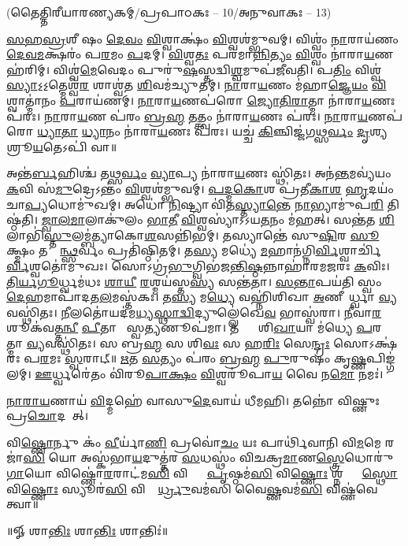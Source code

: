 

\vspace{-1ex}
\centerline{\normalsize(𑌤𑍈𑌤𑍍𑌤𑌿𑌰𑍀𑌯𑌾𑌰𑌣𑍍𑌯𑌕𑌮𑍍/𑌪𑍍𑌰𑌪𑌾𑌠𑌕𑌃 – 10/𑌅𑌨𑍁𑌵𑌾𑌕𑌃 – 13)}

\ul{𑌸}\ul{𑌹}\ul{𑌸𑍍𑌰}𑌶𑍀\sr%
𑌷𑌂 \ul{𑌦𑍇}\ul{𑌵𑌂} \ul{𑌵𑌿}𑌶𑍍𑌵𑌾𑌕𑍍𑌷𑌂॑ \ul{𑌵𑌿}𑌶𑍍𑌵𑌶॑𑌮𑍍𑌭𑍁𑌵𑌮𑍍। 𑌵𑌿𑌶𑍍𑌵𑌂॑ \ul{𑌨𑌾}𑌰𑌾𑌯॑𑌣𑌂 \ul{𑌦𑍇}\ul{𑌵}\ul{𑌮}𑌕𑍍𑌷𑌰𑌂॑ 𑌪\ul{𑌰}𑌮𑌂 \ul{𑌪}𑌦𑌮𑍍। 
\ul{𑌵𑌿}𑌶𑍍𑌵\ul{𑌤𑌃} 𑌪𑌰॑𑌮𑌾\ul{𑌨𑍍𑌨𑌿}\ul{𑌤𑍍𑌯𑌂} \ul{𑌵𑌿}𑌶𑍍𑌵𑌂 𑌨𑌾॑𑌰𑌾\ul{𑌯}𑌣 𑌹॑𑌰𑌿𑌮𑍍। 𑌵𑌿𑌶𑍍𑌵॑\ul{𑌮𑍇}𑌵𑍇𑌦𑌂 𑌪𑍁𑌰𑍁॑\ul{𑌷}𑌸𑍍𑌤𑌦𑍍𑌵𑌿\ul{𑌶𑍍𑌵}𑌮𑍁𑌪॑𑌜𑍀𑌵𑌤𑌿। 
𑌪\ul{𑌤𑌿𑌂}   𑌵𑌿𑌶𑍍𑌵॑\ul{𑌸𑍍𑌯𑌾}𑌽॒𑌽॒𑌤𑍍𑌮𑍇𑌶𑍍𑌵॑\ul{𑌰}\ul{} 𑌶𑌾𑌶𑍍𑌵॑𑌤 \ul{𑌶𑌿}𑌵𑌮॑𑌚𑍍𑌯𑍁𑌤𑌮𑍍। \ul{𑌨𑌾}𑌰𑌾\ul{𑌯}𑌣𑌂 𑌮॑𑌹𑌾\ul{𑌜𑍍𑌞𑍇}\ul{𑌯𑌂} \ul{𑌵𑌿}𑌶𑍍𑌵𑌾𑌤𑍍𑌮𑌾॑𑌨𑌂 \ul{𑌪}𑌰𑌾𑌯॑𑌣𑌮𑍍। \ul{𑌨𑌾}𑌰𑌾\ul{𑌯}𑌣𑌪॑𑌰𑍋 \ul{𑌜𑍍𑌯𑍋}\ul{𑌤𑌿}\ul{𑌰𑌾}𑌤𑍍𑌮𑌾 𑌨𑌾॑𑌰𑌾\ul{𑌯}𑌣𑌃 𑌪॑𑌰𑌃। \ul{𑌨𑌾}𑌰𑌾\ul{𑌯}𑌣 𑌪॑𑌰𑌂 \ul{𑌬𑍍𑌰}\ul{𑌹𑍍𑌮} \ul{𑌤}𑌤𑍍𑌤𑍍𑌵𑌂 𑌨𑌾॑𑌰𑌾\ul{𑌯}𑌣𑌃 𑌪॑𑌰𑌃। \ul{𑌨𑌾}𑌰𑌾\ul{𑌯}𑌣𑌪॑𑌰𑍋 \ul{𑌧𑍍𑌯𑌾}\ul{𑌤𑌾} \ul{𑌧𑍍𑌯𑌾}𑌨𑌂 𑌨𑌾॑𑌰𑌾\ul{𑌯}𑌣𑌃 𑌪॑𑌰𑌃। 𑌯𑌚𑍍𑌚॑ \ul{𑌕𑌿}𑌞𑍍𑌚𑌿𑌜𑍍𑌜॑𑌗\ul{𑌥𑍍𑌸}\ul{𑌰𑍍𑌵𑌂} \ul{𑌦𑍃}𑌶𑍍𑌯𑌤𑍇᳚ 𑌶𑍍𑌰𑍂\ul{𑌯}𑌤𑍇𑌽𑌪𑌿॑ 𑌵𑌾॥ 

𑌅𑌨𑍍𑌤॑\ul{𑌰𑍍𑌬}𑌹𑌿𑌶𑍍𑌚॑ 𑌤\ul{𑌥𑍍𑌸}\ul{𑌰𑍍𑌵𑌂} \ul{𑌵𑍍𑌯𑌾}𑌪𑍍𑌯 𑌨𑌾॑𑌰𑌾\ul{𑌯}𑌣𑌃 𑌸𑍍𑌥𑌿॑𑌤𑌃। 𑌅𑌨॑\ul{𑌨𑍍𑌤}𑌮𑌵𑍍𑌯॑𑌯𑌂 \ul{𑌕}𑌵𑌿 𑌸॑\ul{𑌮𑍁}𑌦𑍍𑌰𑍇𑌽𑌨𑍍𑌤𑌂॑  \ul{𑌵𑌿}𑌶𑍍𑌵𑌶॑𑌮𑍍𑌭𑍁𑌵𑌮𑍍। \ul{𑌪}\ul{𑌦𑍍𑌮}\ul{𑌕𑍋}𑌶 𑌪𑍍𑌰॑𑌤𑍀\ul{𑌕𑌾}\ul{𑌶}\ul{} \ul{𑌹𑍃}𑌦𑌯𑌂॑ 𑌚𑌾\ul{𑌪𑍍𑌯}𑌧𑍋𑌮𑍁॑𑌖𑌮𑍍। 𑌅𑌧𑍋॑ \ul{𑌨𑌿}𑌷𑍍𑌟𑍍𑌯𑌾 𑌵𑌿॑𑌤\ul{𑌸𑍍𑌤𑍍𑌯𑌾}\ul{𑌨𑍍𑌤𑍇} \ul{𑌨𑌾}𑌭𑍍𑌯𑌾𑌮𑍁॑𑌪\ul{𑌰𑌿} 𑌤𑌿𑌷𑍍𑌠॑𑌤𑌿। \ul{𑌜𑍍𑌵𑌾}\ul{𑌲}\ul{𑌮𑌾}𑌲𑌾𑌕𑍁॑𑌲𑌂 \ul{𑌭𑌾}\ul{𑌤𑍀} \ul{𑌵𑌿}𑌶𑍍𑌵𑌸𑍍𑌯𑌾॑𑌽𑌽𑌯\ul{𑌤}𑌨𑌂 𑌮॑𑌹𑌤𑍍। 𑌸𑌨𑍍𑌤॑𑌤 \ul{𑌶𑌿}𑌲𑌾𑌭𑌿॑\ul{𑌸𑍍𑌤𑍁}\-𑌲𑌮𑍍𑌬॑𑌤𑍍𑌯𑌾𑌕𑍋\ul{𑌶}𑌸𑌨𑍍𑌨𑌿॑𑌭𑌮𑍍। 𑌤𑌸𑍍𑌯𑌾𑌨𑍍𑌤𑍇॑ 𑌸𑍁\ul{𑌷𑌿}𑌰 \ul{𑌸𑍂}𑌕𑍍𑌷𑍍𑌮𑌂 𑌤𑌸𑍍𑌮𑌿᳚\ul{𑌨𑍍𑌥𑍍𑌸}𑌰𑍍𑌵𑌂 𑌪𑍍𑌰𑌤𑌿॑𑌷𑍍𑌠𑌿𑌤𑌮𑍍। 𑌤\ul{𑌸𑍍𑌯} 𑌮𑌧𑍍𑌯𑍇॑ \ul{𑌮}𑌹𑌾𑌨॑\-𑌗𑍍𑌨𑌿\ul{𑌰𑍍𑌵𑌿}𑌶𑍍𑌵𑌾𑌰𑍍𑌚𑌿॑\ul{𑌰𑍍𑌵𑌿}𑌶𑍍𑌵𑌤𑍋॑𑌮𑍁𑌖𑌃। 𑌸𑍋𑌽𑌗𑍍𑌰॑\ul{𑌭𑍁}𑌗𑍍𑌵𑌿𑌭॑𑌜\ul{𑌨𑍍𑌤𑌿}\ul{𑌷𑍍𑌠}𑌨𑍍𑌨𑌾𑌹𑌾॑𑌰𑌮\ul{𑌜}𑌰𑌃 \ul{𑌕}𑌵𑌿𑌃। \ul{𑌤𑌿}\ul{𑌰𑍍𑌯}\ul{𑌗𑍂}𑌰𑍍𑌧𑍍𑌵𑌮॑𑌧𑌃 \ul{𑌶𑌾}\ul{𑌯𑍀} \ul{𑌰}𑌶𑍍𑌮𑌯॑𑌸𑍍𑌤\ul{𑌸𑍍𑌯} 𑌸𑌨𑍍𑌤॑𑌤𑌾। \ul{𑌸}\ul{𑌨𑍍𑌤𑌾}𑌪𑌯॑𑌤𑌿 𑌸𑍍𑌵𑌂 \ul{𑌦𑍇}𑌹𑌮𑌾𑌪𑌾॑𑌦𑌤\ul{𑌲}𑌮𑌸𑍍𑌤॑𑌕𑌃। 𑌤\ul{𑌸𑍍𑌯} 𑌮\ul{𑌧𑍍𑌯𑍇} 𑌵𑌹𑍍𑌨𑌿॑𑌶𑌿𑌖𑌾 \ul{𑌅}𑌣𑍀𑌯𑍋᳚𑌰𑍍𑌧𑍍𑌵𑌾 \ul{𑌵𑍍𑌯}𑌵𑌸𑍍𑌥𑌿॑𑌤𑌃। \ul{𑌨𑍀}𑌲𑌤𑍋॑𑌯𑌦॑\-𑌮\ul{𑌧𑍍𑌯}\ul{𑌸𑍍𑌥𑌾}\ul{𑌦𑍍𑌵𑌿}𑌦𑍍𑌯𑍁𑌲𑍍𑌲𑍇॑𑌖𑍇\ul{𑌵}  𑌭𑌾𑌸𑍍𑌵॑𑌰𑌾। \ul{𑌨𑍀}𑌵𑌾\ul{𑌰}𑌶𑍂𑌕॑𑌵\ul{𑌤𑍍𑌤}\ul{𑌨𑍍𑌵𑍀} \ul{𑌪𑍀}𑌤𑌾 𑌭𑌾᳚𑌸𑍍𑌵\ul{𑌤𑍍𑌯}𑌣𑍂𑌪॑𑌮𑌾। 𑌤𑌸𑍍𑌯𑌾𑌃᳚ 𑌶𑌿\ul{𑌖𑌾}𑌯𑌾 𑌮॑𑌧𑍍𑌯𑍇 \ul{𑌪}𑌰𑌮𑌾᳚𑌤𑍍𑌮𑌾 \ul{𑌵𑍍𑌯}𑌵𑌸𑍍𑌥𑌿॑𑌤𑌃। 𑌸 𑌬𑍍𑌰\ul{𑌹𑍍𑌮} 𑌸 𑌶𑌿\ul{𑌵𑌃} 𑌸 𑌹\ul{𑌰𑌿𑌃} 𑌸𑍇\ul{𑌨𑍍𑌦𑍍𑌰𑌃} 𑌸𑍋𑌽𑌕𑍍𑌷॑𑌰𑌃 𑌪\ul{𑌰}𑌮𑌃 \ul{𑌸𑍍𑌵}𑌰𑌾𑌟𑍍॥ 
\ul{𑌋}𑌤 \ul{𑌸}𑌤𑍍𑌯𑌂 𑌪॑𑌰𑌂 \ul{𑌬𑍍𑌰}\ul{𑌹𑍍𑌮} \ul{𑌪𑍁}𑌰𑍁𑌷𑌂॑ 𑌕𑍃\ul{𑌷𑍍𑌣}𑌪𑌿𑌙𑍍𑌗॑𑌲𑌮𑍍। \ul{𑌊}𑌰𑍍𑌧𑍍𑌵𑌰𑍇॑𑌤𑌂 𑌵𑌿॑𑌰𑍂\ul{𑌪𑌾}\ul{𑌕𑍍𑌷𑌂} \ul{𑌵𑌿}𑌶𑍍𑌵𑌰𑍂॑𑌪𑌾\ul{𑌯} 𑌵𑍈 𑌨\ul{𑌮𑍋} 𑌨𑌮𑌃॑। 

\ul{𑌨𑌾}\ul{𑌰𑌾}\ul{𑌯}𑌣𑌾𑌯॑ \ul{𑌵𑌿}𑌦𑍍𑌮𑌹𑍇॑ 𑌵𑌾𑌸𑍁\ul{𑌦𑍇}𑌵𑌾𑌯॑ 𑌧𑍀𑌮𑌹𑌿। 𑌤𑌨𑍍𑌨𑍋॑ 𑌵𑌿𑌷𑍍𑌣𑍁𑌃 𑌪𑍍𑌰\ul{𑌚𑍋}𑌦𑌯𑌾᳚𑌤𑍍। 

𑌵𑌿\ul{𑌷𑍍𑌣𑍋}𑌰𑍍𑌨𑍁 𑌕𑌂॑ \ul{𑌵𑍀}𑌰𑍍𑌯𑌾॑\ul{𑌣𑌿} 𑌪𑍍𑌰𑌵𑍋॑\ul{𑌚𑌂} 𑌯𑌃 𑌪𑌾𑌰𑍍𑌥𑌿॑𑌵𑌾𑌨𑌿 𑌵𑌿\ul{𑌮}𑌮𑍇 𑌰𑌜𑌾॑\ul{𑌸𑌿} 𑌯𑍋 𑌅𑌸𑍍𑌕॑𑌭𑌾\ul{𑌯}𑌦𑍁𑌤𑍍𑌤॑𑌰 \ul{𑌸}𑌧𑌸𑍍𑌥𑌂॑ 𑌵𑌿𑌚𑌕𑍍𑌰\ul{𑌮𑌾}𑌣\ul{𑌸𑍍𑌤𑍍𑌰𑍇}𑌧𑍋𑌰𑍁॑\ul{𑌗𑌾}𑌯𑍋 𑌵𑌿𑌷𑍍𑌣𑍋॑\ul{𑌰}𑌰𑌾𑌟॑𑌮\ul{𑌸𑌿} 𑌵𑌿𑌷𑍍𑌣𑍋𑌃᳚ \ul{𑌪𑍃}𑌷𑍍𑌠𑌮॑\ul{𑌸𑌿} 𑌵𑌿\ul{𑌷𑍍𑌣𑍋𑌃} 𑌶𑍍𑌨𑌪𑍍𑌤𑍍𑌰𑍇᳚\ul{𑌸𑍍𑌥𑍋} 𑌵𑌿\ul{𑌷𑍍𑌣𑍋𑌃} 𑌸𑍍𑌯𑍂𑌰॑\ul{𑌸𑌿} 𑌵𑌿𑌷𑍍𑌣𑍋᳚\ul{𑌰𑍍𑌧𑍍𑌰𑍁}𑌵𑌮॑𑌸𑌿 𑌵𑍈\ul{𑌷𑍍𑌣}𑌵𑌮॑\ul{𑌸𑌿} 𑌵𑌿𑌷𑍍𑌣॑𑌵𑍇 𑌤𑍍𑌵𑌾॥ 

\centerline{॥𑍐 𑌶𑌾\ul{𑌨𑍍𑌤𑌿𑌃} 𑌶𑌾\ul{𑌨𑍍𑌤𑌿𑌃} 𑌶𑌾𑌨𑍍𑌤𑌿𑌃॑॥}
